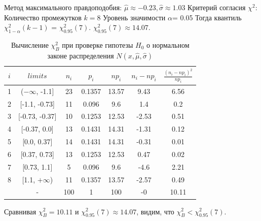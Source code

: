 \noindent Метод максимального правдоподобия:
\newline
$\hat{\mu} \approx -0.23, \hat{\sigma} \approx 1.03$
\newline
Критерий согласия $\chi^{2}$:
\newline
Количество промежутков $k = 8$
\newline
Уровень значимости $\alpha$= 0.05
\newline
Тогда квантиль $\chi^{2}_{1-\alpha}(k-1)$ = $\chi^{2}_{0.95}(7)$. $\chi^{2}_{0.95}(7) \approx 14.07$. 
\begin{table}[H]
	\centering
	\begin{tabular}{| c | c | c | c | c | c | c |}
		\hline
		$i$ & $limits$         &   $n_i$ &    $p_i$ &   $np_i$ &   $n_i - np_i$ &   $\frac{(n_i-np_i)^2}{np_i}$ \\
		\hline
		1 & ($-\infty$, -1.1] &    23 & 0.1357 &  13.57 &         9.43 &                        6.56 \\
		2 & [-1.1, -0.73]  &    11 & 0.096  &   9.6  &         1.4  &                        0.2  \\
		3 & [-0.73, -0.37] &    10 & 0.1253 &  12.53 &        -2.53 &                        0.51 \\
		4 & [-0.37, 0.0]   &    13 & 0.1431 &  14.31 &        -1.31 &                        0.12 \\
		5 & [0.0, 0.37]    &    14 & 0.1431 &  14.31 &        -0.31 &                        0.01 \\
		6 & [0.37, 0.73]   &    13 & 0.1253 &  12.53 &         0.47 &                        0.02 \\
		7 & [0.73, 1.1]    &     5 & 0.096  &   9.6  &        -4.6  &                        2.21 \\
		8 & [1.1, $+\infty$)   &    11 & 0.1357 &  13.57 &        -2.57 &                        0.49 \\
		\sum & -              &   100 & 1      & 100    &        -0    &                       10.11 \\
		\hline
	\end{tabular}
	\caption{ Вычисление $\chi^{2}_{B}$ при проверке гипотезы $H_{0}$ о нормальном законе распределения $N(x,\hat{\mu}, \hat{\sigma})$}
	\label{tab:normal_chi_2}
\end{table} 

\noindent Сравнивая $\chi^{2}_{B} = 10.11$ и $\chi^{2}_{0.95}(7) \approx 14.07$, видим, что $\chi^{2}_{B} < \chi^{2}_{0.95}(7)$.
\\

